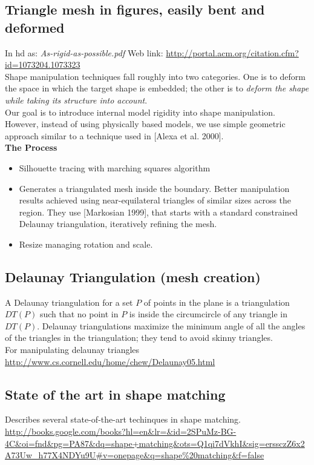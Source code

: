 \documentclass{article}
\begin{document}
\subsection{Triangle mesh in figures, easily bent and deformed}
In hd as: \emph{As-rigid-as-possible.pdf}
Web link: \url{http://portal.acm.org/citation.cfm?id=1073204.1073323}\\

Shape manipulation techniques fall roughly into two categories.
One is to deform the space in which the target shape is embedded;
the other is to \emph{deform the shape while taking its structure into
account}.\\

Our goal
is to introduce internal model rigidity into shape manipulation.
However, instead of using physically based models, we use
simple geometric approach similar to a technique used in [Alexa
et al. 2000]. \\

\textbf{The Process}
\begin{itemize}
\item Silhouette tracing with marching squares algorithm
\item Generates a triangulated mesh inside the boundary. Better manipulation
  results achieved using near-equilateral triangles of similar sizes 
  across the region. They use [Markosian 1999], that starts with a standard
  constrained Delaunay triangulation, iteratively refining the mesh.
\item Resize managing rotation and scale.
\end{itemize}

\subsection{Delaunay Triangulation (mesh creation)}
A Delaunay triangulation for a set $P$ of points in the plane is 
a triangulation   $DT(P)$ such that no point in $P$ is inside the 
circumcircle of any triangle  in $DT(P)$. Delaunay triangulations maximize 
the minimum angle of all the angles of the triangles in the triangulation; 
they tend to avoid skinny triangles.\\

For manipulating delaunay triangles
\url{http://www.cs.cornell.edu/home/chew/Delaunay05.html}

\subsection{State of the art in shape matching}
Describes several state-of-the-art techinques in shape matching.\\
\url{http://books.google.com/books?hl=en&lr=&id=2SPuMz-BG-4C&oi=fnd&pg=PA87&dq=shape+matching&ots=Q1qi7dVkhI&sig=erssczZ6x2A73Uw_h77X4NDYu9U#v=onepage&q=shape%20matching&f=false}\\
\end{document}
